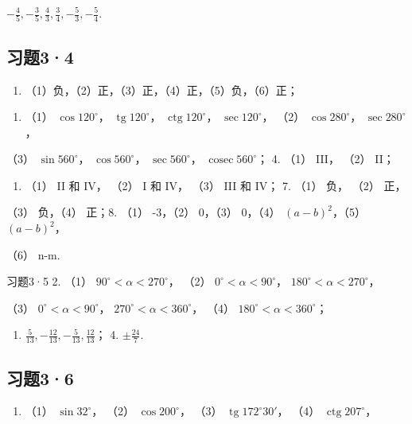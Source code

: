 \(-\frac{4}{5}, -\frac{3}{5}, \frac{4}{3}, \frac{3}{4}, -\frac{5}{3}, -\frac{5}{4}\).

\subsection{习题3·4}

\begin{enumerate}[start=1]
\item
  （1）负，（2）正，（3）正，（4）正，（5）负，（6）正；
\end{enumerate}

\begin{enumerate}[start=2]
\item
  （1） \(\cos 120^{\circ}\)， \(\operatorname{tg} 120^{\circ}\)，
  \(\operatorname{ctg} 120^{\circ}\)， \(\sec 120^{\circ}\)， （2）
  \(\cos 280^{\circ}\)， \(\sec 280^{\circ}\)，
\end{enumerate}

（3） \(\sin 560^{\circ}\)， \(\cos 560^{\circ}\)，
\(\sec 560^{\circ}\)， \(\operatorname{cosec} 560^{\circ}\)； 4. （1）
III， （2） II；

\begin{enumerate}[start=5]
\item
  （1） II 和 IV， （2） I 和 IV， （3） III 和 IV； 7. （1） 负， （2）
  正，
\end{enumerate}

（3） 负，（4） 正；8. （1） -3，（2） 0，（3） 0，（4）
\((a - b)^{2}\)，（5） \((a - b)^{2}\)，

（6） n-m.

习题3·5 2. （1） \(90^{\circ} < \alpha < 270^{\circ}\)， （2）
\(0^{\circ} < \alpha < 90^{\circ}\)，
\(180^{\circ} < \alpha < 270^{\circ}\)，

（3） \(0^{\circ} < \alpha < 90^{\circ}\)，
\(270^{\circ} < \alpha < 360^{\circ}\)， （4）
\(180^{\circ} < \alpha < 360^{\circ}\)；

\begin{enumerate}[start=3]
\item
  \(\frac{5}{13}, -\frac{12}{13}, -\frac{5}{13}, \frac{12}{13}\)； 4.
  \(\pm \frac{24}{7}\).
\end{enumerate}

\subsection{习题3·6}

\begin{enumerate}
\item
  （1） \(\sin 32^{\circ}\)， （2） \(\cos 200^{\circ}\)， （3）
  \(\operatorname{tg} 172^{\circ}30'\)， （4）
  \(\operatorname{ctg} 207^{\circ}\)，
\end{enumerate}

